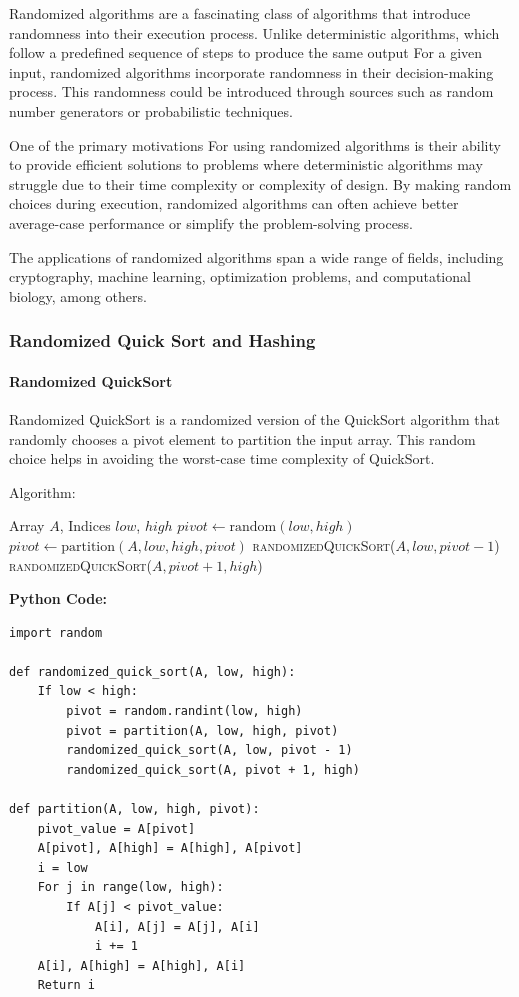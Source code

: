 \documentclass[12pt]{book} %
\begin{document}
Randomized algorithms are a fascinating class of algorithms that introduce randomness into their execution process. Unlike deterministic algorithms, which follow a predefined sequence of steps to produce the same output For a given input, randomized algorithms incorporate randomness in their decision-making process. This randomness could be introduced through sources such as random number generators or probabilistic techniques.

One of the primary motivations For using randomized algorithms is their ability to provide efficient solutions to problems where deterministic algorithms may struggle due to their time complexity or complexity of design. By making random choices during execution, randomized algorithms can often achieve better average-case performance or simplify the problem-solving process.

The applications of randomized algorithms span a wide range of fields, including cryptography, machine learning, optimization problems, and computational biology, among others.
\FloatBarrier
\subsubsection{Randomized Quick Sort and Hashing}
\paragraph{Randomized QuickSort}

Randomized QuickSort is a randomized version of the QuickSort algorithm that randomly chooses a pivot element to partition the input array. This random choice helps in avoiding the worst-case time complexity of QuickSort.

Algorithm:
\FloatBarrier
\begin{algorithm}
\caption{Randomized QuickSort}
\begin{algorithmic}[1]
\State Array $A$, Indices $low$, $high$
        \State $pivot \gets \text{random}(low, high)$
        \State $pivot \gets \text{partition}(A, low, high, pivot)$
        \State \textsc{randomizedQuickSort}($A, low, pivot-1$)
        \State \textsc{randomizedQuickSort}($A, pivot+1, high$)
    \EndIf
\EndFunction
\end{algorithmic}
\end{algorithm}

\FloatBarrier
\textbf{Python Code:}
\FloatBarrier
\begin{verbatim}
import random

def randomized_quick_sort(A, low, high):
    If low < high:
        pivot = random.randint(low, high)
        pivot = partition(A, low, high, pivot)
        randomized_quick_sort(A, low, pivot - 1)
        randomized_quick_sort(A, pivot + 1, high)

def partition(A, low, high, pivot):
    pivot_value = A[pivot]
    A[pivot], A[high] = A[high], A[pivot]
    i = low
    For j in range(low, high):
        If A[j] < pivot_value:
            A[i], A[j] = A[j], A[i]
            i += 1
    A[i], A[high] = A[high], A[i]
    Return i
\end{verbatim}
\FloatBarrier
\end{document}

